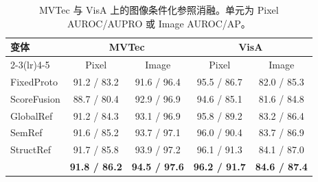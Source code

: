 \begin{table}[t]
\centering
\caption{MVTec 与 VisA 上的图像条件化参照消融。单元为 Pixel AUROC/AUPRO 或 Image AUROC/AP。}
\label{tab:controlled-core-ablation}
\small
\setlength{\tabcolsep}{5pt}
\begin{tabular}{@{}lcccc@{}}
\toprule
\multirow{2}{*}{变体} & \multicolumn{2}{c}{MVTec} & \multicolumn{2}{c}{VisA} \\
\cmidrule(lr){2-3}\cmidrule(lr){4-5}
& Pixel & Image & Pixel & Image \\
\midrule
FixedProto & 91.2 / 83.2 & 91.6 / 96.4 & 95.5 / 86.7 & 82.0 / 85.3 \\
ScoreFusion & 88.7 / 80.4 & 92.9 / 96.9 & 94.6 / 85.1 & 81.6 / 84.8 \\
GlobalRef & 91.2 / 84.3 & 93.1 / 96.9 & 95.8 / 89.2 & 83.2 / 86.4 \\
SemRef & 91.6 / 85.2 & 93.7 / 97.1 & 96.0 / 90.4 & 83.7 / 86.9 \\
StructRef & 91.7 / 85.8 & 93.9 / 97.2 & 96.1 / 91.3 & 84.1 / 87.0 \\
\method{} & \textbf{91.8 / 86.2} & \textbf{94.5 / 97.6} & \textbf{96.2 / 91.7} & \textbf{84.6 / 87.4} \\
\bottomrule
\end{tabular}
\end{table}

